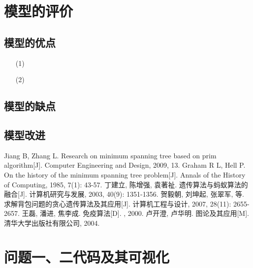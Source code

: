 \documentclass{whutmod}
\begin{document}
  	\section{模型的评价}
		\subsection{模型的优点}
			\begin{itemize}                                             
			\item [(1)]
			\item [(2)] 	
			\end{itemize}
		\subsection{模型的缺点}

  		\subsection{模型改进}

  
  
 
	\newpage	%
	\nocite{*}		%
	\begin{thebibliography}{9}%
		Jiang B, Zhang L. Research on minimum spanning tree based on prim algorithm[J]. Computer Engineering and Design, 2009, 13.
		Graham R L, Hell P. On the history of the minimum spanning tree problem[J]. Annals of the History of Computing, 1985, 7(1): 43-57.
		丁建立, 陈增强, 袁著祉. 遗传算法与蚂蚁算法的融合[J]. 计算机研究与发展, 2003, 40(9): 1351-1356.
		贺毅朝, 刘坤起, 张翠军, 等. 求解背包问题的贪心遗传算法及其应用[J]. 计算机工程与设计, 2007, 28(11): 2655-2657.
		王磊, 潘进, 焦李成. 免疫算法[D]. , 2000.
		卢开澄, 卢华明. 图论及其应用[M]. 清华大学出版社有限公司, 2004.
	\end{thebibliography}

	\newpage
	\appendix %
	\section{问题一、二代码及其可视化}
\end{document}
